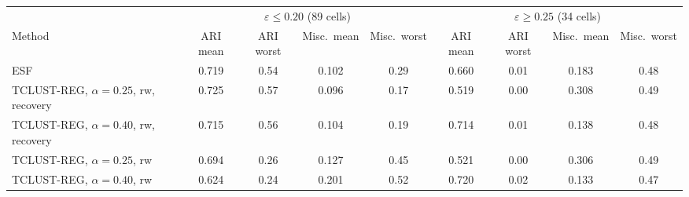 \begin{tabular}{lcccccccc}
\toprule
 & \multicolumn{4}{c}{$\varepsilon\le0.20$ (89 cells)} & \multicolumn{4}{c}{$\varepsilon\ge0.25$ (34 cells)} \\
\cmidrule(lr){2-5}\cmidrule(lr){6-9}
Method & ARI mean & ARI worst & Misc.\ mean & Misc.\ worst & ARI mean & ARI worst & Misc.\ mean & Misc.\ worst \\
\midrule
ESF & 0.719 & 0.54 & 0.102 & 0.29 & 0.660 & 0.01 & 0.183 & 0.48 \\
TCLUST-REG, $\alpha=0.25$, rw, recovery & 0.725 & 0.57 & 0.096 & 0.17 & 0.519 & 0.00 & 0.308 & 0.49 \\
TCLUST-REG, $\alpha=0.40$, rw, recovery & 0.715 & 0.56 & 0.104 & 0.19 & 0.714 & 0.01 & 0.138 & 0.48 \\
TCLUST-REG, $\alpha=0.25$, rw & 0.694 & 0.26 & 0.127 & 0.45 & 0.521 & 0.00 & 0.306 & 0.49 \\
TCLUST-REG, $\alpha=0.40$, rw & 0.624 & 0.24 & 0.201 & 0.52 & 0.720 & 0.02 & 0.133 & 0.47 \\
\bottomrule
\end{tabular}